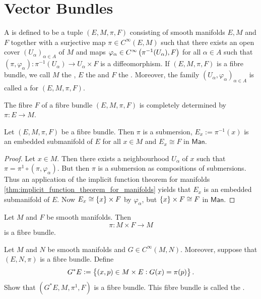 \section*{Vector Bundles}

\begin{definition}
	A  is defined to be a tuple $(E,M,\pi,F)$ consisting of smooth manifolds $E,M$ and $F$ together with a surjective map $\pi \in C^\infty(E,M)$ such that there exists an open cover $(U_\alpha)_{\alpha \in A}$ of $M$ and maps $\varphi_\alpha \in C^\infty\del[1]{\pi^{-1}(U_\alpha), F}$ for all $\alpha \in A$ such that $(\pi,\varphi_\alpha) : \pi^{-1}(U_\alpha) \to U_\alpha \times F$ is a diffeomorphism. If $(E,M,\pi,F)$ is a fibre bundle, we call $M$ the , $E$ the  and $F$ the . Moreover, the family $(U_\alpha,\varphi_\alpha)_{\alpha \in A}$ is called a  for $(E,M,\pi,F)$.
\end{definition}

The fibre $F$ of a fibre bundle $(E,M,\pi,F)$ is completely determined by $\pi : E \to M$. 

\begin{proposition}
	Let $(E,M,\pi,F)$ be a fibre bundle. Then $\pi$ is a submersion, $E_x := \pi^{-1}(x)$ is an embedded submanifold of $E$ for all $x \in M$ and $E_x \cong F$ in $\mathsf{Man}$.
\end{proposition}

\begin{proof}
	Let $x \in M$. Then there exists a neighbourhood $U_\alpha$ of $x$ such that $\pi = \pi^1 \circ (\pi,\varphi_\alpha)$. But then $\pi$ is a submersion as compositions of submersions. Thus an application of the implicit function theorem for manifolds \ref{thm:implicit_function_theorem_for_manifolds} yields that $E_x$ is an embedded submanifold of $E$. Now $E_x \cong \cbr{x} \times F$ by $\varphi_\alpha$, but $\cbr{x} \times F \cong F$ in $\mathsf{Man}$.	
\end{proof}

\begin{example}
	Let $M$ and $F$ be smooth manifolds. Then 
	\begin{equation*}
		\pi : M \times F \to M
	\end{equation*}
	\noindent is a fibre bundle.
\end{example}

\begin{exercise}
	Let $M$ and $N$ be smooth manifolds and $G \in C^\infty(M,N)$. Moreover, suppose that $(E,N,\pi)$ is a fibre bundle. Define
	\begin{equation*}
		G^*E := \cbr[1]{(x,p) \in M \times E : G(x) = \pi(p)}.
	\end{equation*}
	Show that $(G^*E,M,\pi^1,F)$ is a fibre bundle. This fibre bundle is called the .
\end{exercise}

